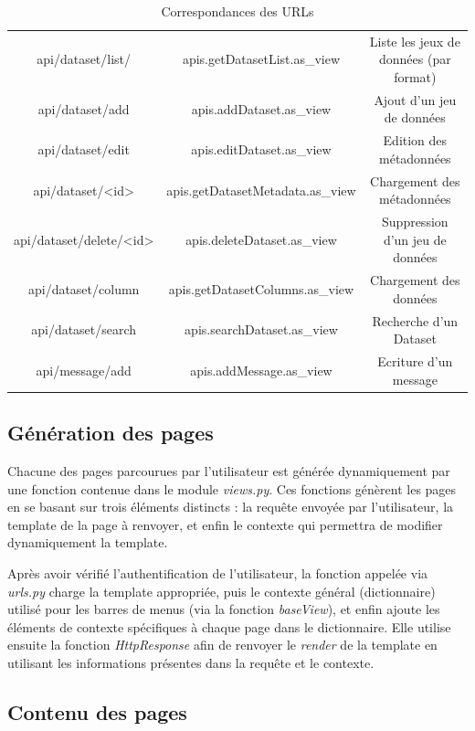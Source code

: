\documentclass[a4paper]{report}
\begin{document}
\begin{table}[!h]
\begin{tabular}{|c|c|c|}
api/dataset/list/ & apis.getDatasetList.as\_view & Liste les jeux de données (par format) \\
api/dataset/add & apis.addDataset.as\_view & Ajout d'un jeu de données \\
api/dataset/edit & apis.editDataset.as\_view & Edition des métadonnées \\
api/dataset/<id> & apis.getDatasetMetadata.as\_view & Chargement des métadonnées \\
api/dataset/delete/<id> &  apis.deleteDataset.as\_view & Suppression d'un jeu de données \\
api/dataset/column &  apis.getDatasetColumns.as\_view & Chargement des données \\
api/dataset/search &  apis.searchDataset.as\_view & Recherche d'un Dataset \\
api/message/add & apis.addMessage.as\_view & Ecriture d'un message \\
\hline
\end{tabular}
\caption{\label{tab:urls} Correspondances des URLs}
\end{table}

\subsection{Génération des pages}
\label{subsec:view}

Chacune des pages parcourues par l'utilisateur est générée dynamiquement par une fonction contenue dans le module \emph{views.py}. Ces fonctions génèrent les pages en se basant sur trois éléments distincts : la requête envoyée par l'utilisateur, la template de la page à renvoyer, et enfin le contexte qui permettra de modifier dynamiquement la template.

Après avoir vérifié l'authentification de l'utilisateur, la fonction appelée via \emph{urls.py} charge la template appropriée, puis le contexte général (dictionnaire) utilisé pour les barres de menus (via la fonction \emph{baseView}), et enfin ajoute les éléments de contexte spécifiques à chaque page dans le dictionnaire.
Elle utilise ensuite la fonction \emph{HttpResponse} afin de renvoyer le \emph{render} de la template en utilisant les informations présentes dans la requête et le contexte.

\subsection{Contenu des pages}
\label{subsec:template}
\end{document}
